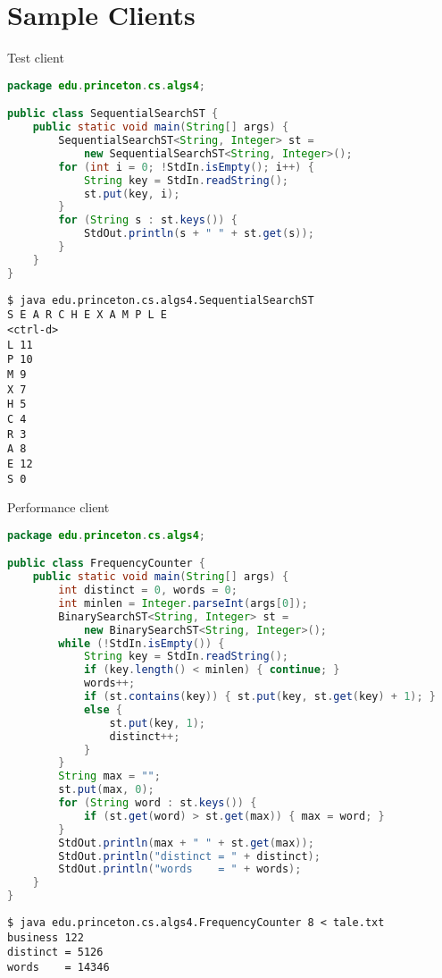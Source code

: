 \documentclass[8pt,a4paper,compress]{beamer}
\begin{document}
\section{Sample Clients}
\begin{frame}[fragile]
\pause

Test client

\smallskip

\begin{lstlisting}[language=Java,style=focusin]
package edu.princeton.cs.algs4;

public class SequentialSearchST {
    public static void main(String[] args) {
        SequentialSearchST<String, Integer> st = 
            new SequentialSearchST<String, Integer>();
        for (int i = 0; !StdIn.isEmpty(); i++) {
            String key = StdIn.readString();
            st.put(key, i);
        }
        for (String s : st.keys()) {
            StdOut.println(s + " " + st.get(s));
        }
    }
}
\end{lstlisting}

\pause
\bigskip

\begin{lstlisting}[language={},style=focusin]
$ java edu.princeton.cs.algs4.SequentialSearchST 
S E A R C H E X A M P L E
<ctrl-d>
L 11
P 10
M 9
X 7
H 5
C 4
R 3
A 8
E 12
S 0
\end{lstlisting}
\end{frame}

\begin{frame}[fragile]
\pause

Performance client

\bigskip

\begin{lstlisting}[language=Java,style=focusin]
package edu.princeton.cs.algs4;

public class FrequencyCounter {
    public static void main(String[] args) {
        int distinct = 0, words = 0;
        int minlen = Integer.parseInt(args[0]);
        BinarySearchST<String, Integer> st = 
            new BinarySearchST<String, Integer>();
        while (!StdIn.isEmpty()) {
            String key = StdIn.readString();
            if (key.length() < minlen) { continue; }
            words++;
            if (st.contains(key)) { st.put(key, st.get(key) + 1); }
            else {
                st.put(key, 1);
                distinct++;
            }
        }
        String max = "";
        st.put(max, 0);
        for (String word : st.keys()) {
            if (st.get(word) > st.get(max)) { max = word; }
        }
        StdOut.println(max + " " + st.get(max));
        StdOut.println("distinct = " + distinct);
        StdOut.println("words    = " + words);
    }
}
\end{lstlisting}

\pause
\bigskip

\begin{lstlisting}[language={},style=focusin]
$ java edu.princeton.cs.algs4.FrequencyCounter 8 < tale.txt 
business 122
distinct = 5126
words    = 14346
\end{lstlisting}
\end{frame}
\end{document}
